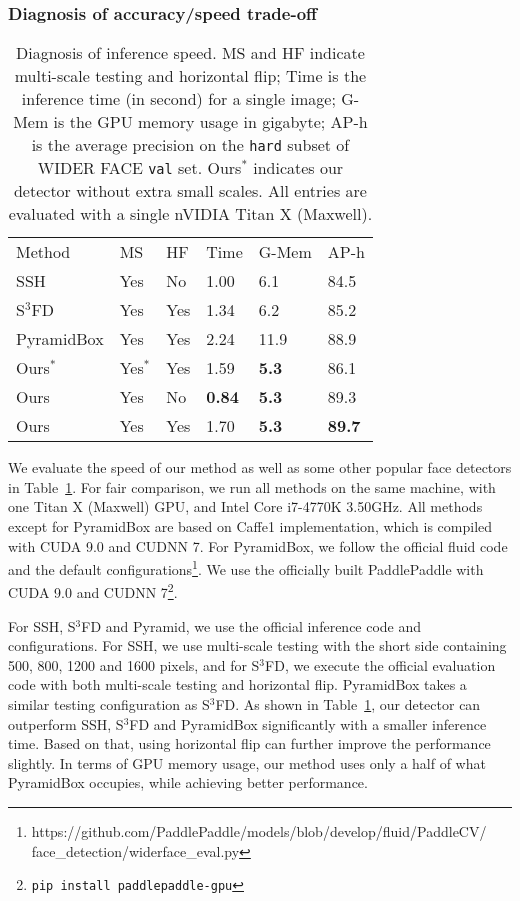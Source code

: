 \documentclass[10pt,twocolumn,letterpaper]{article}
\begin{document}
\subsubsection*{Diagnosis of accuracy/speed trade-off}
\begin{table}[!t]
\centering
\begin{tabular}{|l|l|l|l|l|l|}
\hline
Method     & MS  & HF  & Time & G-Mem & AP-h   \\ \hhline{|=|=|=|=|=|=|}
SSH        & Yes & No  & 1.00 & 6.1        & 84.5 \\ \hline
S$^3$FD       & Yes & Yes & 1.34 & 6.2        & 85.2 \\ \hline
PyramidBox & Yes & Yes & 2.24 & 11.9       & 88.9 \\ \hline
Ours$^*$       & Yes$^*$ & Yes  & 1.59 & \bf{5.3}        & 86.1    \\ \hline
Ours       & Yes & No  & \bf{0.84} & \bf{5.3}        &  89.3\\ \hline
Ours       & Yes & Yes & 1.70 & \bf{5.3}        &  \bf{89.7}    \\ \hline
\end{tabular}
\caption{Diagnosis of inference speed. MS and HF indicate multi-scale testing and
horizontal flip; Time is the inference time (in second) for a single image;
G-Mem is the GPU memory usage in gigabyte;
AP-h is the average precision on the \texttt{hard} subset of WIDER FACE
\texttt{val} set. Ours$^*$ indicates our detector without extra small scales.
All entries are evaluated with a single nVIDIA Titan X (Maxwell).\label{tbl:speed}}
\end{table}
We evaluate the speed of our method as well as some other popular face detectors in
Table~\ref{tbl:speed}. For fair comparison, we run all methods on the same machine,
with one Titan X (Maxwell) GPU, and Intel Core i7-4770K 3.50GHz. All methods
except for PyramidBox are based on Caffe1 implementation, which is compiled with CUDA 9.0 and CUDNN 7.
For PyramidBox, we follow the official fluid code and the default configurations\footnote{https://github.com/PaddlePaddle/models/blob/develop/fluid/PaddleCV/\\
face\_detection/widerface\_eval.py}. We
use the officially built PaddlePaddle with CUDA 9.0 and CUDNN 7\footnote{\texttt{pip install paddlepaddle-gpu}}.

For SSH, S$^3$FD and Pyramid, we use the official inference code and configurations. For SSH,
we use multi-scale testing with the short side containing 500, 800, 1200 and 1600
pixels, and for S$^3$FD, we execute the official evaluation code with both multi-scale
testing and horizontal flip. PyramidBox takes a similar testing configuration as S$^3$FD.
As shown in Table~\ref{tbl:speed}, our detector can
outperform SSH, S$^3$FD and PyramidBox significantly with a smaller inference time. Based on that,
using horizontal flip can further improve the performance slightly.
In terms of GPU memory usage, our method uses only a half of what PyramidBox occupies,
while achieving better performance.
\end{document}

